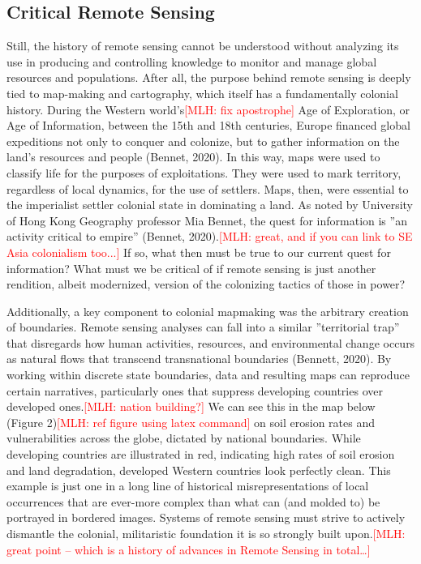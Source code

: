 \documentclass{book}\usepackage{knitr}
\newcommand{\red}[1]{\textcolor{red}{[MLH: #1]}}
\begin{document}
\begin{knitrout}
\begin{kframe}
\subsection{Critical Remote Sensing}

Still, the history of remote sensing cannot be understood without analyzing its use in producing and controlling knowledge to monitor and manage global resources and populations. After all, the purpose behind remote sensing is deeply tied to map-making and cartography, which itself has a fundamentally colonial history. During the Western world’s\red{fix apostrophe} Age of Exploration, or Age of Information, between the 15th and 18th centuries, Europe financed global expeditions not only to conquer and colonize, but to gather information on the land’s resources and people (Bennet, 2020). In this way, maps were used to classify life for the purposes of exploitations. They were used to mark territory, regardless of local dynamics, for the use of settlers. Maps, then, were essential to the imperialist settler colonial state in dominating a land. As noted by University of Hong Kong Geography professor Mia Bennet, the quest for information is ''an activity critical to empire'' (Bennet, 2020).\red{great, and if you can link to SE Asia colonialism too...} If so, what then must be true to our current quest for information? What must we be critical of if remote sensing is just another rendition, albeit modernized, version of the colonizing tactics of those in power?

Additionally, a key component to colonial mapmaking was the arbitrary creation of boundaries. Remote sensing analyses can fall into a similar ''territorial trap'' that disregards how human activities, resources, and environmental change occurs as natural flows that transcend transnational boundaries (Bennett, 2020). By working within discrete state boundaries, data and resulting maps can reproduce certain narratives, particularly ones that suppress developing countries over developed ones.\red{nation building?} We can see this in the map below (Figure 2)\red{ref figure using latex command} on soil erosion rates and vulnerabilities across the globe, dictated by national boundaries. While developing countries are illustrated in red, indicating high rates of soil erosion and land degradation, developed Western countries look perfectly clean. This example is just one in a long line of historical misrepresentations of local occurrences that are ever-more complex than what can (and molded to) be portrayed in bordered images. Systems of remote sensing must strive to actively dismantle the colonial, militaristic foundation it is so strongly built upon.\red{great point -- which is a history of advances in Remote Sensing in total\ldots}


\end{kframe}
\end{knitrout}
\end{document}
